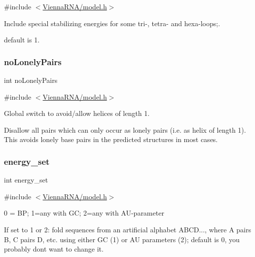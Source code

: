 {\ttfamily \#include $<$\mbox{\hyperlink{model_8h}{Vienna\+R\+N\+A/model.\+h}}$>$}



Include special stabilizing energies for some tri-\/, tetra-\/ and hexa-\/loops;. 

default is 1. \mbox{\label{group__model__details_ga097eccaabd6ae8b4fef83cccff85bb5d}} 
\subsubsection{\texorpdfstring{noLonelyPairs}{noLonelyPairs}}
{\footnotesize\ttfamily int no\+Lonely\+Pairs}



{\ttfamily \#include $<$\mbox{\hyperlink{model_8h}{Vienna\+R\+N\+A/model.\+h}}$>$}



Global switch to avoid/allow helices of length 1. 

Disallow all pairs which can only occur as lonely pairs (i.\+e. as helix of length 1). This avoids lonely base pairs in the predicted structures in most cases. \mbox{\label{group__model__details_gafb1ef1166da85092ae8a325e02dcae71}} 
\subsubsection{\texorpdfstring{energy\_set}{energy\_set}}
{\footnotesize\ttfamily int energy\+\_\+set}



{\ttfamily \#include $<$\mbox{\hyperlink{model_8h}{Vienna\+R\+N\+A/model.\+h}}$>$}



0 = BP; 1=any with GC; 2=any with A\+U-\/parameter 

If set to 1 or 2\+: fold sequences from an artificial alphabet A\+B\+CD..., where A pairs B, C pairs D, etc. using either GC (1) or AU parameters (2); default is 0, you probably don\textquotesingle{}t want to change it. \mbox{\label{group__model__details_gad512b5dd4dbec60faccfe137bb474489}} 
